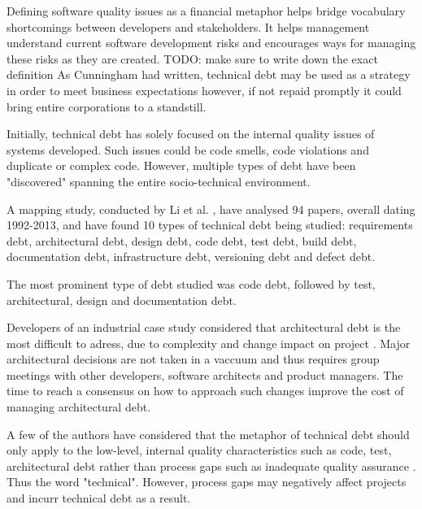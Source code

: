 \documentclass{mprop}
\begin{document}
Defining software quality issues as a financial metaphor helps bridge vocabulary shortcomings between developers and stakeholders.
It helps management understand current software development risks and encourages ways for managing these risks as they are created.
TODO: make sure to write down the exact definition
As Cunningham \cite{Cunningham1993} had written, technical debt may be used as a strategy in order to meet business expectations however, if not repaid promptly it could bring entire corporations to a standstill.

Initially, technical debt has solely focused on the internal quality issues of systems developed.
Such issues could be code smells, code violations and duplicate or complex code.
However, multiple types of debt have been "discovered" spanning the entire socio-technical environment.

A mapping study, conducted by Li et al. \cite{Li2015}, have analysed 94 papers, overall dating 1992-2013, and have found 10 types of technical debt being studied:
requirements debt,
architectural debt,
design debt,
code debt,
test debt,
build debt,
documentation debt,
infrastructure debt,
versioning debt
and defect debt.

The most prominent type of debt studied was code debt, followed by test, architectural, design and documentation debt.

Developers of an industrial case study considered that architectural debt is the most difficult to adress, due to complexity and change impact on project \cite{Codabux2013}. 
Major architectural decisions are not taken in a vaccuum and thus requires group meetings with other developers, software architects and product managers.
The time to reach a consensus on how to approach such changes improve the cost of managing architectural debt.

A few of the authors have considered that the metaphor of technical debt should only apply to the low-level, internal quality characteristics such as code, test, architectural debt rather than process gaps such as inadequate quality assurance \cite{Theodoropoulos2011} \cite{Nugroho2011}.
Thus the word "technical".
However, process gaps may negatively affect projects and incurr technical debt as a result.

\end{document}
